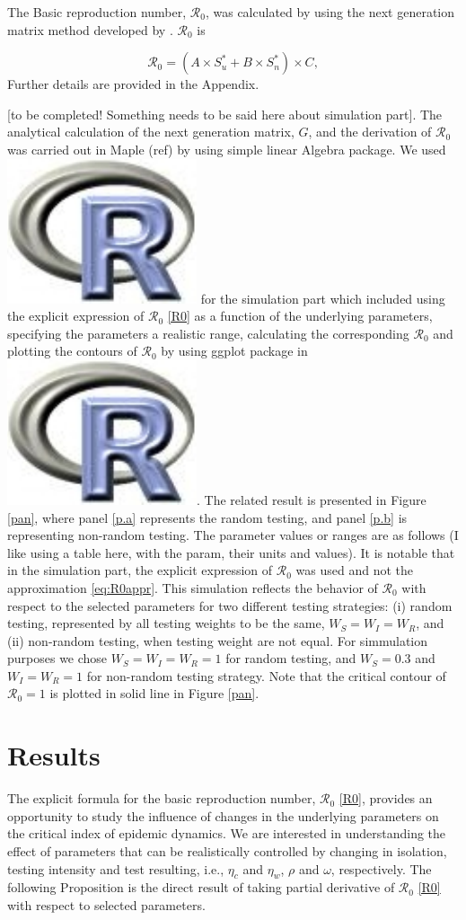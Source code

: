 \documentclass[12pt]{article}
\newcommand{\Rlogo}{\protect\includegraphics[height=2ex,keepaspectratio]
{pix/Rlogo.pdf}\xspace}
\newcommand{\Rnum}{\mathcal{R}_0}
\theoremstyle{definition} %
\begin{document}
The Basic reproduction number, $\Rnum$, was calculated by using the next generation matrix method developed by \cite{van2002reproduction}. $\Rnum$ is

\begin{equation}
\label{R0}
\Rnum= (A \times S_u^* + B \times S_n^*) \times C, 
\end{equation}
Further details are provided in the Appendix.
 
  [to be completed! Something needs to be said here about simulation part]. The analytical calculation of the next generation matrix, $G$, and the derivation of $\Rnum$ was carried out in Maple (ref) by using simple linear Algebra package. 
  We used \Rlogo for the simulation part which included using the explicit expression of $\Rnum$ \ref{R0} as a function of the underlying parameters, specifying the parameters a realistic range, calculating the corresponding $\Rnum$ and plotting the contours of $\Rnum$ by using ggplot package in \Rlogo. The related result is presented in Figure \ref{pan}, where  panel \eqref{p.a} represents the random testing, and panel \eqref{p.b} is representing non-random testing. The parameter values or ranges are as follows (I like using a table here, with the param, their units and values). It is notable that in the simulation part, the explicit expression of $\Rnum$ was used and not the approximation \eqref{eq:R0appr}. This simulation reflects the behavior of $\Rnum$ with respect to the selected parameters for two different testing strategies: (i) random testing, represented by all testing weights to be the same, $W_S=W_I=W_R$, and (ii) non-random testing, when testing weight are not equal. For simmulation purposes we chose $W_S=W_I=W_R=1$ for random testing, and $W_S=0.3$ and $W_I=W_R=1$ for non-random testing strategy. Note that the critical contour of $\Rnum=1$ is plotted in solid line in Figure \ref{pan}. 


\section{Results}

The explicit formula for the basic reproduction number, $\Rnum$ \eqref{R0}, provides an opportunity to study the influence of changes in the underlying parameters on the critical index of epidemic dynamics. We are interested in understanding the effect of parameters that can be realistically controlled by changing in isolation, testing intensity and test resulting, i.e., $\eta_c$ and $\eta_w$, $\rho$ and $\omega$, respectively. The following Proposition is the direct result of taking partial derivative of $\Rnum$ \eqref{R0} with respect to selected parameters. 
\end{document}
